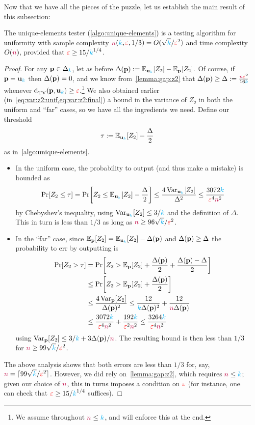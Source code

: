 Now that we have all the pieces of the puzzle, let us establish the main result of this subsection:
\begin{theorem}
  \label{theo:uniformity:unique:elements}
The unique-elements tester (\cref{algo:unique-elements}) is a testing algorithm for uniformity with sample complexity ${\textcolor{purple}{n}}({\textcolor{cyan}{k}},\textcolor{red}{\varepsilon},1/3) = O(\sqrt{{\textcolor{cyan}{k}}}/\textcolor{red}{\varepsilon}^2)$ and time complexity $O({\textcolor{purple}{n}})$, provided that $\textcolor{red}{\varepsilon} \geq 15/{\textcolor{cyan}{k}}^{1/4}$.
\end{theorem}
\begin{proof}
For any $\mathbf{p}\in\Delta_{{\textcolor{cyan}{k}}}$, let as before $\Delta(\p) \eqdef \bE{\uniform_\ab}{Z_2} - \bE{\p}{Z_2}$. Of course, if $\mathbf{p}=\mathbf{u}_{\textcolor{cyan}{k}}$ then $\Delta(\mathbf{p})=0$, and we know from~\cref{lemma:gap:z2} that $\Delta(\mathbf{p}) \geq \Delta := \frac{{\textcolor{purple}{n}}\textcolor{red}{\varepsilon}^2}{16{\textcolor{cyan}{k}}}$ whenever $\totalvardist{\p}{\uniform_\ab} \geq \dst$.\footnote{We assume throughout ${\textcolor{purple}{n}} \leq {\textcolor{cyan}{k}}$, and will enforce this at the end.} We also obtained earlier (in~\cref{eq:var:z2:unif,eq:var:z2:final}) a bound in the variance of $Z_2$ in both the uniform and ``far'' cases, so we have all the ingredients we need. Define our threshold
\[
    \tau \eqdef \bE{\uniform_\ab}{Z_2} - \frac{\Delta}{2}
\]
as in~\cref{algo:unique-elements}.
\begin{itemize}
    \item In the uniform case, the probability to output \reject (and thus make a mistake) is bounded as
    \[
    \bPr{Z_2 \leq \tau} = \bPr{Z_2 \leq \bE{\uniform_\ab}{Z_2} - \frac{\Delta}{2} } \leq \frac{4\Var_{\uniform_\ab}[Z_2]}{\Delta^2}
    \leq \frac{3072\ab}{\dst^4\ns^2}
    \]
    by Chebyshev's inequality, using $\operatorname{Var}_{\mathbf{u}_{\textcolor{cyan}{k}}}[Z_2] \leq 3/{\textcolor{cyan}{k}}$ and the definition of $\Delta$. This in turn is less than $1/3$ as long as ${\textcolor{purple}{n}} \geq 96\sqrt{{\textcolor{cyan}{k}}}/\textcolor{red}{\varepsilon}^2$.
    \item In the ``far'' case, since $\bE{\p}{Z_2} = \bE{\uniform_\ab}{Z_2} - \Delta(\p)$ and $\Delta(\mathbf{p}) \geq \Delta$ the probability to err by outputting \accept is
    \begin{align*}
        \bPr{Z_2 > \tau} &= \bPr{Z_2 > \bE{\p}{Z_2} + \frac{\Delta(\p)}{2} + \frac{\Delta(\p)-\Delta}{2} } \\       
        &\leq \bPr{Z_2 > \bE{\p}{Z_2} + \frac{\Delta(\p)}{2} } \\
        &\leq \frac{4\Var_{\p}[Z_2]}{\Delta(\p)^2} 
        \leq \frac{12}{\ab \Delta(\p)^2} + \frac{12}{\ns \Delta(\p)} \\
        &\leq \frac{3072\ab}{\dst^4\ns^2} + \frac{192\ab}{\dst^2\ns^2} \leq \frac{3264\ab}{\dst^4\ns^2}
    \end{align*}
    using $\operatorname{Var}_{\mathbf{p}}[Z_2] \leq 3/{\textcolor{cyan}{k}}+3\Delta(\mathbf{p})/{\textcolor{purple}{n}}$. The resulting bound is then less than $1/3$ for ${\textcolor{purple}{n}} \geq 99\sqrt{{\textcolor{cyan}{k}}}/\textcolor{red}{\varepsilon}^2$.
  \end{itemize}
  The above analysis shows that both errors are less than $1/3$ for, say, ${\textcolor{purple}{n}} = \lceil{99\sqrt{{\textcolor{cyan}{k}}}/\textcolor{red}{\ensuremath{\varepsilon}}^2}\rceil$. However, we did rely on~\cref{lemma:gap:z2}, which requires ${\textcolor{purple}{n}} \leq {\textcolor{cyan}{k}}$; given our choice of ${\textcolor{purple}{n}}$, this in turns imposes a condition on $\textcolor{red}{\varepsilon}$ (for instance, one can check that $\textcolor{red}{\varepsilon} \geq 15/{\textcolor{cyan}{k}}^{1/4}$ suffices).
\end{proof}

